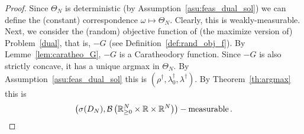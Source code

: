 \begin{proof}
  Since $\Theta_N$ is deterministic (by Assumption~\ref{asu:feas_dual_sol})
  we can define the (constant) correspondence
  $\omega \mapsto \Theta_N$.
  Clearly, this is weakly-measurable.
  Next, we consider the (random) objective function of (the maximize version of) Problem~\ref{dual}, that is, $-G$ (see Definition~\ref{def:rand_obj_f}).
  By Lemme~\ref{lem:caratheo_G}, $-G$  is a Caratheodory function.
  Since $-G$ is also strictly concave, it has a unique argmax in $\Theta_N$.
  By Assumption~\ref{asu:feas_dual_sol} this is 
  $
  \left( \rho^\dagger,\lambda_0^\dagger,\lambda^\dagger \right)
  $.
  By Theorem~\ref{th:argmax} this is
  \begin{align*}
  \left(
    \sigma
    (D_N)
    ,\mathcal{B}
  \left(
  \mathbb{R}^N_{\ge 0}
  \times
  \mathbb{R}
  \times
  \mathbb{R}^{N}
  \right)
  \right)
  -\text{measurable}
  \,.
  \end{align*}
\end{proof}

